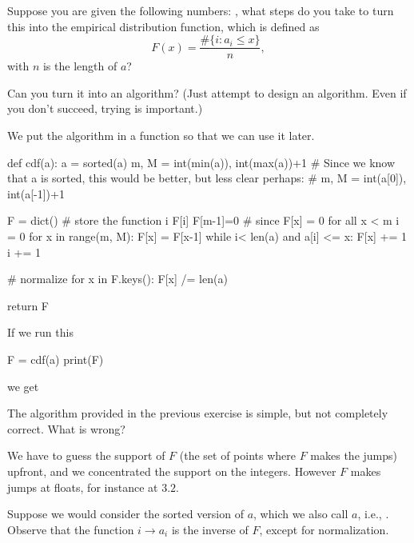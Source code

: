 \documentclass{scrartcl}
\begin{document}
\begin{exercise}
  Suppose you are given the following numbers: , what steps  do you take to  turn this into the empirical distribution function, which is defined as
  \begin{equation}
    \label{eq:1}
    F(x) = \frac{\# \{i : a_i \leq x\}}{n}, 
  \end{equation}
  with $n$ is the length of $a$?

Can you turn it into an algorithm? (Just attempt to design an algorithm. Even if you don't succeed, trying is important.)

  \begin{solution}
We put the algorithm in a function so that we can use it later.
    \begin{pyblock}
def cdf(a):
    a = sorted(a)
    m, M = int(min(a)), int(max(a))+1
    # Since we know that a is sorted, this would be better, but less clear perhaps: 
    # m, M = int(a[0]), int(a[-1])+1 

    F = dict() # store the function i \to F[i]
    F[m-1]=0  # since F[x] = 0 for all x < m
    i = 0
    for x in range(m, M):
        F[x] = F[x-1]
        while i< len(a) and a[i] <= x:
            F[x] += 1
            i += 1

    # normalize
    for x in F.keys(): 
        F[x] /= len(a)

    return F
    \end{pyblock}

If we run this
\begin{pyblock}
F = cdf(a)
print(F)
\end{pyblock}
we get
\printpythontex
  \end{solution}
\end{exercise}

\begin{exercise}
  The algorithm provided in the previous exercise is simple, but not completely correct. What is wrong?
  \begin{solution}
    We have to guess the support of $F$ (the set of points where $F$ makes the jumps) upfront, and we concentrated the support on the integers. However $F$ makes jumps at floats, for instance  at $3.2$. 
  \end{solution}
\end{exercise}

Suppose we would consider the sorted version of $a$, which we also call $a$, i.e., . Observe that the function $i\to a_i$ is the inverse of $F$, except for normalization.
\end{document}
